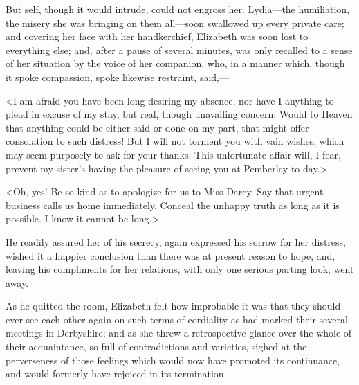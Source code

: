 But self, though it would intrude, could not engross her. Lydia—the humiliation, the misery she was bringing on them all—soon swallowed up every private care; and covering her face with her handkerchief, Elizabeth was soon lost to everything else; and, after a pause of several minutes, was only recalled to a sense of her situation by the voice of her companion, who, in a manner which, though it spoke compassion, spoke likewise restraint, said,—

<I am afraid you have been long desiring my absence, nor have I anything to plead in excuse of my stay, but real, though unavailing concern. Would to Heaven that anything could be either said or done on my part, that might offer consolation to such distress! But I will not torment you with vain wishes, which may seem purposely to ask for your thanks. This unfortunate affair will, I fear, prevent my sister's having the pleasure of seeing you at Pemberley to-day.>

<Oh, yes! Be so kind as to apologize for us to Miss Darcy. Say that urgent business calls us home immediately. Conceal the unhappy truth as long as it is possible. I know it cannot be long.>

He readily assured her of his secrecy, again expressed his sorrow for her distress, wished it a happier conclusion than there was at present reason to hope, and, leaving his compliments for her relations, with only one serious parting look, went away.

As he quitted the room, Elizabeth felt how improbable it was that they should ever see each other again on such terms of cordiality as had marked their several meetings in Derbyshire; and as she threw a retrospective glance over the whole of their acquaintance, so full of contradictions and varieties, sighed at the perverseness of those feelings which would now have promoted its continuance, and would formerly have rejoiced in its termination.

